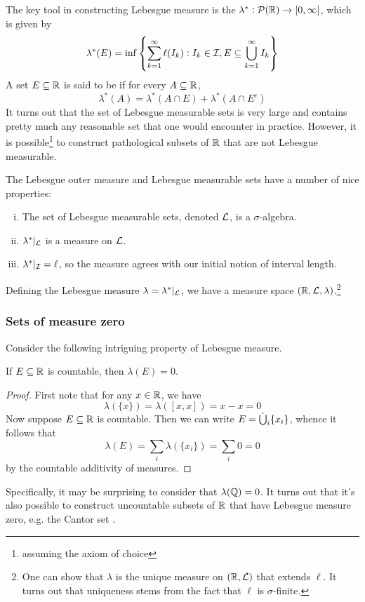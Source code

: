 \documentclass{article}
\begin{document}
The key tool in constructing Lebesgue measure is the  $\lambda^* : \mathcal{P}(\mathbb{R}) \to [0,\infty]$, which is given by
\[\lambda^*(E) = \inf\left\{\sum_{k=1}^\infty \ell(I_k) : I_k \in \mathcal{I}, E \subseteq \bigcup_{k=1}^\infty I_k\right\}\]
A set $E \subseteq \mathbb{R}$ is said to be  if for every $A \subseteq \mathbb{R}$,
\[\lambda^*(A) = \lambda^*(A \cap E) + \lambda^*(A \cap E^c)\]
It turns out that the set of Lebesgue measurable sets is very large and contains pretty much any reasonable set that one would encounter in practice.
However, it is possible\footnote{
    assuming the axiom of choice
} to construct pathological subsets of $\mathbb{R}$ that are not Lebesgue measurable.

The Lebesgue outer measure and Lebesgue measurable sets have a number of nice properties:
\begin{enumerate}[(i)]
\item The set of Lebesgue measurable sets, denoted $\mathcal{L}$, is a $\sigma$-algebra.
\item $\lambda^*|_{\mathcal{L}}$ is a measure on $\mathcal{L}$.
\item $\lambda^*|_{\mathcal{I}} = \ell$, so the measure agrees with our initial notion of interval length.
\end{enumerate}
Defining the Lebesgue measure $\lambda = \lambda^*|_{\mathcal{L}}$, we have a measure space $(\mathbb{R}, \mathcal{L}, \lambda)$.\footnote{
    One can show that $\lambda$ is the unique measure on $(\mathbb{R}, \mathcal{L})$ that extends $\ell$.
    It turns out that uniqueness stems from the fact that $\ell$ is $\sigma$-finite.
}

\subsubsection{Sets of measure zero}
Consider the following intriguing property of Lebesgue measure.
\begin{proposition}
If $E \subseteq \mathbb{R}$ is countable, then $\lambda(E) = 0$.
\end{proposition}
\begin{proof}
First note that for any $x \in \mathbb{R}$, we have
\[\lambda(\{x\}) = \lambda([x,x]) = x - x = 0\]
Now suppose $E \subseteq \mathbb{R}$ is countable.
Then we can write $E = \mathop{\dot{\bigcup}}_i \{x_i\}$, whence it follows that
\[\lambda(E) = \sum_i \lambda(\{x_i\}) = \sum_i 0 = 0\]
by the countable additivity of measures.
\end{proof}
Specifically, it may be surprising to consider that $\lambda(\mathbb{Q}) = 0$.
It turns out that it's also possible to construct uncountable subsets of $\mathbb{R}$ that have Lebesgue measure zero, e.g. the Cantor set \cite{folland}.
\end{document}
